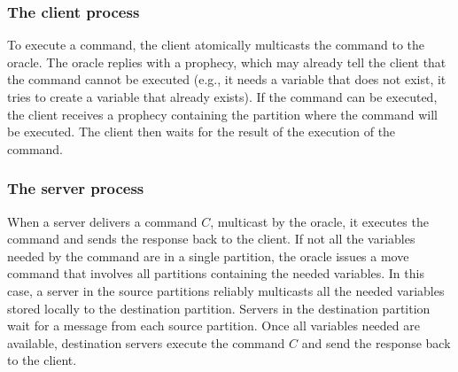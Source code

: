 \subsubsection{The client process}
\label{sec:dynastar-client}
To execute a command, the client atomically multicasts the command to the
oracle. The oracle replies with a prophecy, which may already tell the client
that the command cannot be executed (e.g., it needs a variable that does not
exist, it tries to create a variable that already exists). If the command can be
executed, the client receives a prophecy containing the partition where the
command will be executed. The client then waits for the result of the execution
of the command.

\subsubsection{The server process}
\label{sec:dynastar-server}
When a server delivers a command $C$, multicast by the oracle, it executes the
command and sends the response back to the client. If not all the variables
needed by the command are in a single partition, the oracle issues a move
command that involves all partitions containing the needed variables.
In this case, a server in the source partitions reliably multicasts all the
needed variables stored locally to the destination partition. Servers in the
destination partition wait for a message from each source partition. Once all
variables needed are available, destination servers execute the command $C$ and
send the response back to the client.




